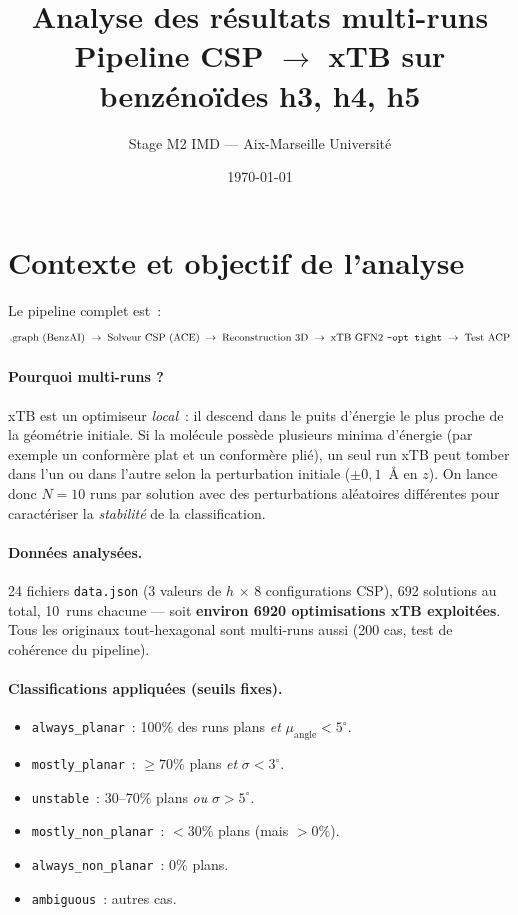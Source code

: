 \documentclass[11pt,a4paper]{article}
\title{\color{bleuTitre}\textbf{Analyse des résultats multi-runs\\[0.2cm]
Pipeline CSP $\to$ xTB sur benzénoïdes h3, h4, h5}}
\author{Stage M2 IMD --- Aix-Marseille Université}
\date{\today}
\begin{document}
\maketitle

\tableofcontents
\bigskip

\section{Contexte et objectif de l'analyse}

Le pipeline complet est~:
\[
\text{.graph (BenzAI)} \;\to\; \text{Solveur CSP (ACE)} \;\to\; \text{Reconstruction 3D} \;\to\; \text{xTB GFN2 \texttt{--opt tight}} \;\to\; \text{Test ACP}
\]

\paragraph{Pourquoi multi-runs ?}
xTB est un optimiseur \emph{local}~: il descend dans le puits d'énergie le plus proche de la géométrie initiale. Si la molécule possède plusieurs minima d'énergie (par exemple un conformère plat et un conformère plié), un seul run xTB peut tomber dans l'un ou dans l'autre selon la perturbation initiale ($\pm 0{,}1$~Å en $z$). On lance donc $N=10$ runs par solution avec des perturbations aléatoires différentes pour caractériser la \emph{stabilité} de la classification.

\paragraph{Données analysées.}
24 fichiers \texttt{data.json} (3 valeurs de $h$ $\times$ 8 configurations CSP), 692 solutions au total, 10~runs chacune --- soit \textbf{environ 6920 optimisations xTB exploitées}. Tous les originaux tout-hexagonal sont multi-runs aussi (200 cas, test de cohérence du pipeline).

\paragraph{Classifications appliquées (seuils fixes).}
\begin{itemize}[leftmargin=2em,itemsep=0.2em]
  \item \texttt{always\_planar}~: 100\% des runs plans \emph{et} $\mu_{\text{angle}} < 5^\circ$.
  \item \texttt{mostly\_planar}~: $\geq 70\%$ plans \emph{et} $\sigma < 3^\circ$.
  \item \texttt{unstable}~: 30--70\% plans \emph{ou} $\sigma > 5^\circ$.
  \item \texttt{mostly\_non\_planar}~: $< 30\%$ plans (mais $> 0\%$).
  \item \texttt{always\_non\_planar}~: 0\% plans.
  \item \texttt{ambiguous}~: autres cas.
\end{itemize}
\end{document}
